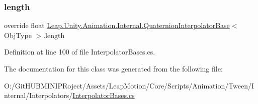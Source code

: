 \subsubsection{\texorpdfstring{length}{length}}
{\footnotesize\ttfamily override float \mbox{\hyperlink{class_leap_1_1_unity_1_1_animation_1_1_internal_1_1_quaternion_interpolator_base}{Leap.\+Unity.\+Animation.\+Internal.\+Quaternion\+Interpolator\+Base}}$<$ Obj\+Type $>$.length\hspace{0.3cm}{\ttfamily [get]}}



Definition at line 100 of file Interpolator\+Bases.\+cs.



The documentation for this class was generated from the following file\+:\begin{DoxyCompactItemize}
\item 
O\+:/\+Git\+H\+U\+B\+M\+I\+N\+I\+P\+Roject/\+Assets/\+Leap\+Motion/\+Core/\+Scripts/\+Animation/\+Tween/\+Internal/\+Interpolators/\mbox{\hyperlink{_interpolator_bases_8cs}{Interpolator\+Bases.\+cs}}\end{DoxyCompactItemize}
